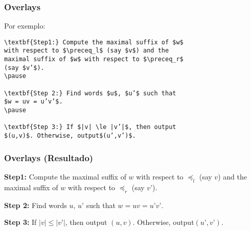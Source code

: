 \begin{frame}[fragile]
\frametitle{Overlays}
Por exemplo: 

\begin{verbatim}
\textbf{Step1:} Compute the maximal suffix of $w$
with respect to $\preceq_l$ (say $v$) and the
maximal suffix of $w$ with respect to $\preceq_r$
(say $v’$).
\pause

\textbf{Step 2:} Find words $u$, $u’$ such that
$w = uv = u’v’$.
\pause

\textbf{Step 3:} If $|v| \le |v’|$, then output
$(u,v)$. Otherwise, output$(u’,v’)$.
\end{verbatim}
\end{frame}

\begin{frame}[fragile]
\frametitle{Overlays (Resultado)}
\textbf{Step1:} Compute the maximal suffix of $w$
with respect to $\preceq_l$ (say $v$) and the
maximal suffix of $w$ with respect to $\preceq_r$
(say $v’$).
\pause

\textbf{Step 2:} Find words $u$, $u’$ such that
$w = uv = u’v’$.
\pause

\textbf{Step 3:} If $|v| \le |v’|$, then output
$(u,v)$. Otherwise, output$(u’,v’)$.
\end{frame}

